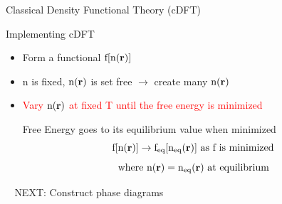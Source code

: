 \documentclass{beamer}
\renewcommand{\vec}[1]{\mathbf{#1}}
\begin{document}
\begin{frame}{Classical Density Functional Theory (cDFT)}
    \begin{block}{Implementing cDFT}
    \begin{itemize}
       \item Form a functional $\text f[\text n(\vec r)]$  \checkmark
       \item n is fixed, $\text n(\vec{r})$ is set free $\rightarrow$ create many $\text n(\vec{r})$ \checkmark
       \item \textcolor{red}{Vary $\text n(\vec{r})$ at fixed T until the free energy is minimized} 
       
       Free Energy goes to its equilibrium value when minimized      
       \begin{displaymath}\text f[\text n(\vec r)]\rightarrow \text f_{\text{eq}}[\text n_{\text{eq}}(\vec r)]  \mbox{ as f is minimized} \end{displaymath}
       \begin{displaymath}{\mbox{where }  \text n(\vec{r}) = \text n_{\text{eq}}(\vec r)  \mbox{ at equilibrium}}\end{displaymath}              
    \end{itemize}   
    \vspace{+1em}
       $~~~~$NEXT: Construct phase diagrams %
 
     \end{block}
\end{frame}
\end{document}
